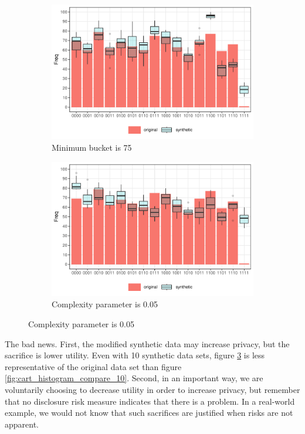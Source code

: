 \documentclass[runningheads]{llncs}
\begin{document}
\begin{figure}[!h]
    \centering
    \caption{Compare original and synthetic data}
    \begin{subfigure}{0.48\textwidth}
        \includegraphics[width=\textwidth]{../graphs/graph_cart_modified_mb_histogram_compare_10.pdf}
        \caption{Minimum bucket is 75}
        \label{fig:attacker_modified_mb}
    \end{subfigure}
    \hfill
    \begin{subfigure}{0.48\textwidth}
        \includegraphics[width=\textwidth]{../graphs/graph_cart_modified_cp_histogram_compare_10.pdf}
        \caption{Complexity parameter is 0.05}
        \label{fig:attacker_modified_cp}
    \end{subfigure}
    \label{fig:compare_modified}
\end{figure}

The bad news.  First, the modified synthetic data may increase privacy, but the sacrifice is lower utility.  Even with 10 synthetic data sets, figure \ref{fig:compare_modified} is less representative of the original data set than figure \ref{fig:cart_histogram_compare_10}.  Second, in an important way, we are voluntarily choosing to decrease utility in order to increase privacy, but remember that no disclosure risk measure indicates that there is a problem.  In a real-world example, we would not know that such sacrifices are justified when risks are not apparent.
\end{document}
